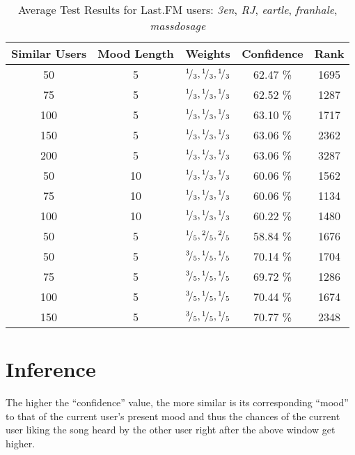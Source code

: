 \begin{table}[h!]
\centering
\begin{tabular}{ | c | c | c || c | c | }
\hline
Similar Users	& Mood Length	& Weights							&Confidence	&Rank\\
\hline \hline
50			& 5			& \({}^{1}\!/_{3}, {}^{1}\!/_{3}, {}^{1}\!/_{3}\)	&62.47 \%		&1695\\
\hline
75			& 5			& \({}^{1}\!/_{3}, {}^{1}\!/_{3}, {}^{1}\!/_{3}\)	&62.52 \%		&1287\\
\hline
100			& 5			& \({}^{1}\!/_{3}, {}^{1}\!/_{3}, {}^{1}\!/_{3}\)	&63.10 \%		&1717\\
\hline
150			& 5			& \({}^{1}\!/_{3}, {}^{1}\!/_{3}, {}^{1}\!/_{3}\)	&63.06 \%		&2362\\
\hline
200			& 5			& \({}^{1}\!/_{3}, {}^{1}\!/_{3}, {}^{1}\!/_{3}\)	&63.06 \%		&3287\\
\hline
50			& 10			& \({}^{1}\!/_{3}, {}^{1}\!/_{3}, {}^{1}\!/_{3}\)	&60.06 \%		&1562\\
\hline
75			& 10			& \({}^{1}\!/_{3}, {}^{1}\!/_{3}, {}^{1}\!/_{3}\)	&60.06 \%		&1134\\
\hline
100			& 10			& \({}^{1}\!/_{3}, {}^{1}\!/_{3}, {}^{1}\!/_{3}\)	&60.22 \%		&1480\\
\hline
50			& 5			& \({}^{1}\!/_{5}, {}^{2}\!/_{5}, {}^{2}\!/_{5}\)	&58.84 \%		&1676\\
\hline
50			& 5			& \({}^{3}\!/_{5}, {}^{1}\!/_{5}, {}^{1}\!/_{5}\)	&70.14 \%		&1704\\
\hline
75			& 5			& \({}^{3}\!/_{5}, {}^{1}\!/_{5}, {}^{1}\!/_{5}\)	&69.72 \%		&1286\\
\hline
100			& 5			& \({}^{3}\!/_{5}, {}^{1}\!/_{5}, {}^{1}\!/_{5}\)	&70.44 \%		&1674\\
\hline
150			& 5			& \({}^{3}\!/_{5}, {}^{1}\!/_{5}, {}^{1}\!/_{5}\)	&70.77 \%		&2348\\
\hline
\end{tabular}
\caption{Average Test Results for Last.FM users: \emph{3en}, \emph{RJ}, \emph{eartle}, \emph{franhale}, \emph{massdosage}}
\label{table:test_results_average}
\end{table}

	\section{Inference}
		The higher the ``confidence'' value, the more similar is its corresponding ``mood'' to that of the current user's present mood and thus the chances of the current user liking the song heard by the other user right after the above window get higher.
		
